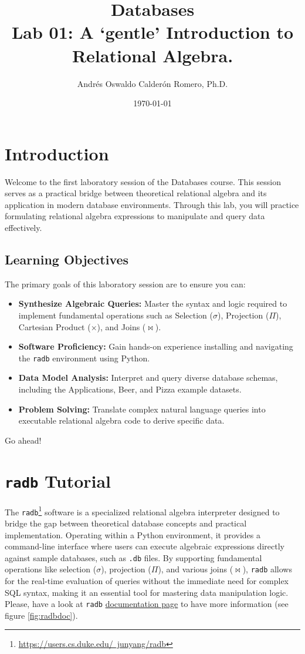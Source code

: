 \documentclass{article}
\title{Databases \\ Lab 01: A `gentle' Introduction to Relational Algebra.}
\author{Andrés Oswaldo Calderón Romero, Ph.D.}
\date{\today}
\begin{document}
\maketitle

\section{Introduction}
Welcome to the first laboratory session of the Databases course. This session serves as a practical bridge between theoretical relational algebra and its application in modern database environments. Through this lab, you will practice formulating relational algebra expressions to manipulate and query data effectively.

\subsection{Learning Objectives}
The primary goals of this laboratory session are to ensure you can:
\begin{itemize}
    \item \textbf{Synthesize Algebraic Queries:} Master the syntax and logic required to implement fundamental operations such as Selection ($\sigma$), Projection ($\Pi$), Cartesian Product ($\times$), and Joins ($\bowtie$).
    \item \textbf{Software Proficiency:} Gain hands-on experience installing and navigating the \texttt{radb} environment using Python.
    \item \textbf{Data Model Analysis:} Interpret and query diverse database schemas, including the Applications, Beer, and Pizza example datasets.
    \item \textbf{Problem Solving:} Translate complex natural language queries into executable relational algebra code to derive specific data.
\end{itemize}

Go ahead!

\section{\texttt{radb} Tutorial}

The \texttt{radb}\footnote{\href{https://users.cs.duke.edu/~junyang/radb}{https://users.cs.duke.edu/~junyang/radb}} software is a specialized relational algebra interpreter designed to bridge the gap between theoretical database concepts and practical implementation. Operating within a Python environment, it provides a command-line interface where users can execute algebraic expressions directly against sample databases, such as \texttt{.db} files. By supporting fundamental operations like selection ($\sigma$), projection ($\Pi$), and various joins ($\bowtie$), \texttt{radb} allows for the real-time evaluation of queries without the immediate need for complex SQL syntax, making it an essential tool for mastering data manipulation logic.  Please, have a look at \texttt{radb} \href{https://users.cs.duke.edu/~junyang/radb/index.html}{documentation page} to have more information (see figure \ref{fig:radbdoc}).
\end{document}
